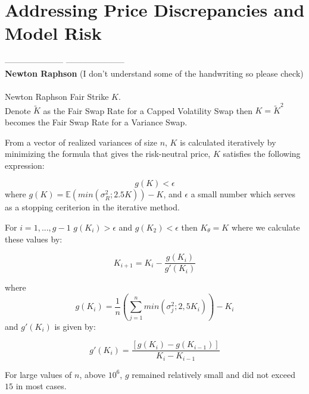 
\section{Addressing Price Discrepancies and Model Risk}

---------------------
---------------------\\
\textbf{Newton Raphson}
(I don't understand some of the handwriting so please check)\\
~\\
Newton Raphson Fair Strike $K$.\\

Denote $\tilde{K}$ as the Fair Swap Rate for a Capped Volatility Swap then $K=\tilde{K}^2$ becomes the Fair Swap Rate for a Variance Swap.

From a vector of realized variances of size $n$, $K$ is calculated iteratively by minimizing the formula that gives the risk-neutral price, $K$ satisfies the following expression:

\begin{equation}
g(K) < \epsilon
\end{equation}
where $g(K) = \mathds{E}(min(\sigma_{R}^2; 2.5K)) - K$, and $\epsilon$ a small number which serves as a stopping ceriterion in the iterative method.

For $i=1,...,g-1$ \hspace{0.2cm} $g(K_i)>\epsilon$ and $g(K_2)<\epsilon$ then $K_\theta=K$ where we calculate these values by:

\begin{equation}
K_{i+1} = K_i - \frac{g(K_i)}{g'(K_i)} 
\end{equation} 

where
\begin{equation}
g(K_i) = \frac{1}{n} \left(\sum_{j=1}^{n} min (\sigma_{j}^2; 2,5K_i)\right) - K_i
\end{equation} 
and $g'(K_i)$ is given by:
 
\begin{equation}
g'(K_i) = \frac{[g(K_i) - g(K_{i-1})]}{K_i - K_{i-1}}
\end{equation} 

For large values of $n$, above $10^6$, $g$ remained relatively small and did not exceed $15$ in most cases.

